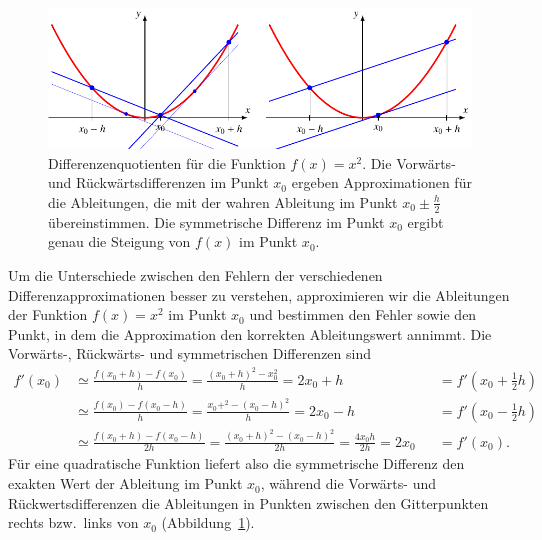 \begin{beispiel}
\begin{figure}
\centering
\includegraphics{chapters/70-pde/images/diffex.pdf}
\caption{Differenzenquotienten für die Funktion $f(x)=x^2$.
Die Vorwärts- und Rückwärtsdifferenzen im Punkt $x_0$ ergeben Approximationen
für die Ableitungen, die mit der wahren Ableitung im Punkt $x_0\pm \frac{h}2$
übereinstimmen.
Die symmetrische Differenz im Punkt $x_0$ ergibt genau die Steigung von $f(x)$
im Punkt $x_0$.
\label{buch:pde:diffex}}
\end{figure}
Um die Unterschiede zwischen den Fehlern der verschiedenen
Differenzapproximationen besser zu verstehen, approximieren wir die
Ableitungen der Funktion $f(x)=x^2$ im Punkt $x_0$ und bestimmen den
Fehler sowie den Punkt, in dem die Approximation den korrekten Ableitungswert
annimmt.
Die Vorwärts-, Rückwärts- und symmetrischen Differenzen sind
\begin{align*}
f'(x_0)
&\simeq
\frac{f(x_0+h)-f(x_0)}{h}
=
\frac{(x_0+h)^2-x_0^2}{h}
=
2x_0+h
&&=
f'(x_0 + {\textstyle\frac12}h)
\\
&\simeq
\frac{f(x_0)-f(x_0-h)}{h}
=
\frac{x_0+^2-(x_0-h)^2}{h}
=
2x_0-h
&&=
f'(x_0 - {\textstyle\frac12}h)
\\
&\simeq
\frac{f(x_0+h)-f(x_0-h)}{2h}
=
\frac{(x_0+h)^2-(x_0-h)^2}{2h}
=
\frac{4x_0h}{2h}=2x_0
&&=
f'(x_0).
\end{align*}
Für eine quadratische Funktion liefert also die symmetrische Differenz
den exakten Wert der Ableitung im Punkt $x_0$, während die Vorwärts-
und Rückwertsdifferenzen die Ableitungen in Punkten zwischen
den Gitterpunkten rechts bzw.~links von $x_0$
(Abbildung~\ref{buch:pde:diffex}).
\end{beispiel}

